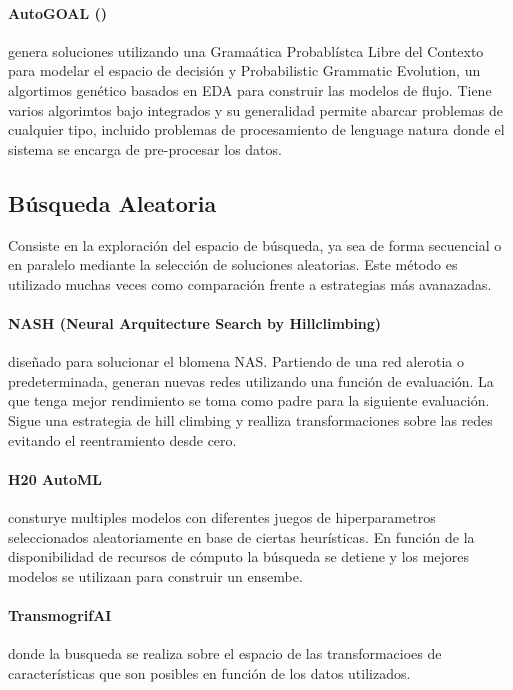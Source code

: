 
     \paragraph{AutoGOAL (\cite{estevez2020solving})} genera soluciones utilizando una Grama\'atica Probabl\'istca Libre del Contexto para modelar el espacio de decisi\'on y Probabilistic Grammatic Evolution, un algortimos gen\'etico basados en EDA para construir las modelos de flujo. Tiene varios algorimtos bajo integrados y su generalidad permite abarcar problemas de cualquier tipo, incluido problemas de procesamiento de lenguage natura donde el sistema se encarga de pre-procesar los datos.


\subsection{B\'usqueda Aleatoria}
      Consiste en la exploraci\'on del espacio de b\'usqueda, ya sea de forma secuencial o en paralelo mediante la selecci\'on de soluciones aleatorias. Este m\'etodo es utilizado muchas veces como comparaci\'on frente a estrategias m\'as avanazadas.

      \paragraph{NASH (Neural Arquitecture Search by Hillclimbing)} diseñado para solucionar el blomena NAS.
        Partiendo de una red alerotia o predeterminada, generan nuevas redes utilizando una funci\'on de evaluaci\'on. La que tenga mejor rendimiento se toma como padre para la siguiente evaluaci\'on.
        Sigue una estrategia de hill climbing y realliza transformaciones sobre las redes evitando el reentramiento desde cero.

      \paragraph{H20 AutoML} consturye multiples modelos con diferentes juegos de hiperparametros seleccionados aleatoriamente en base de ciertas heur\'isticas. En funci\'on de la disponibilidad de recursos de c\'omputo la b\'usqueda se detiene y los mejores modelos se utilizaan para construir un ensembe.

      \paragraph{TransmogrifAI} donde la busqueda se realiza sobre el espacio de las transformacioes de caracter\'isticas que son posibles en funci\'on de los datos utilizados.


